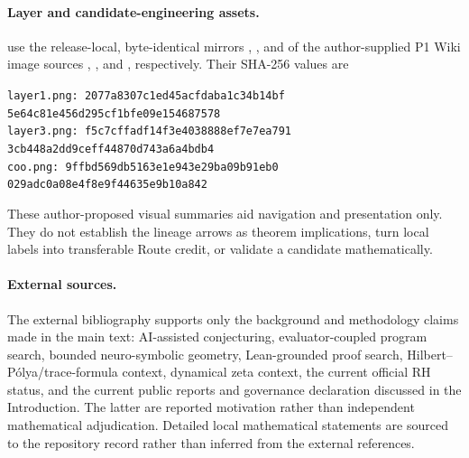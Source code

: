 \paragraph{Layer and candidate-engineering assets.}
 use the release-local,
byte-identical mirrors , , and
 of the author-supplied P1 Wiki image sources
, , and
, respectively. Their SHA-256 values are
\begin{center}\footnotesize
\texttt{layer1.png: 2077a8307c1ed45acfdaba1c34b14bf}\\[-.2ex]
\texttt{5e64c81e456d295cf1bfe09e154687578}\\[.2ex]
\texttt{layer3.png: f5c7cffadf14f3e4038888ef7e7ea791}\\[-.2ex]
\texttt{3cb448a2dd9ceff44870d743a6a4bdb4}\\[.2ex]
\texttt{coo.png: 9ffbd569db5163e1e943e29ba09b91eb0}\\[-.2ex]
\texttt{029adc0a08e4f8e9f44635e9b10a842}
\end{center}
These author-proposed visual summaries aid navigation and presentation only.
They do not establish the lineage arrows as theorem implications, turn local
labels into transferable Route credit, or validate a candidate mathematically.

\paragraph{External sources.}
The external bibliography supports only the background and methodology claims
made in the main text: AI-assisted conjecturing, evaluator-coupled program
search, bounded neuro-symbolic geometry, Lean-grounded proof search,
Hilbert--P\'olya/trace-formula context, dynamical zeta context, the current
official RH status, and the current public reports and governance declaration
discussed in the Introduction. The latter are reported motivation rather than
independent mathematical adjudication. Detailed local mathematical statements
are sourced to the repository record rather than inferred from the external
references.
